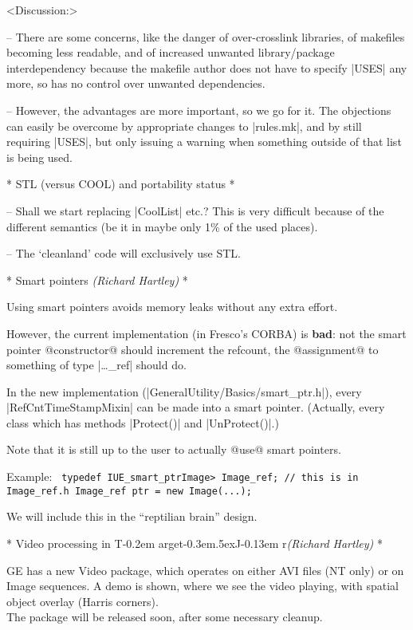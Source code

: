 \documentclass[11pt]{article}
\def\TargetJr{{T\kern-0.2em arget\kern-0.3em\lower.5ex\hbox{\Large J}\kern-0.13em r}}
\def\by#1.{{\normalsize\sf\it(#1)}}\relax
\begin{document}
<Discussion:>

-- There are some concerns, like the danger of over-crosslink libraries,
of makefiles becoming less readable, and of increased unwanted
library/package interdependency because the makefile author does not have to
specify |USES| any more, so has no control over unwanted dependencies.

-- However, the advantages are more important, so we go for it.
The objections can easily be overcome by appropriate changes to |rules.mk|,
and by still requiring |USES|, but only issuing a warning when something
outside of that list is being used.


* STL (versus COOL) and portability status *

-- Shall we start replacing |CoolList| etc.?  This is very difficult because of
the different semantics (be it in maybe only 1\% of the used places).

-- The `cleanland' code will exclusively use STL.


* Smart pointers \by Richard Hartley. *

Using smart pointers avoids memory leaks without any extra effort.

However, the current implementation (in Fresco's CORBA) is {\bf bad}:
not the smart pointer @constructor@ should increment the refcount,
the @assignment@ to something of type |\ldots_ref| should do.

In the new implementation (|GeneralUtility/Basics/smart_ptr.h|),
every |RefCntTimeStampMixin| can be made into a smart pointer.
(Actually, every class which has methods |Protect()| and |UnProtect()|.)

Note that it is still up to the user to actually @use@ smart pointers.

Example:
  {\obeylines\tt
typedef IUE_smart_ptr\<Image> Image_ref; // this is in Image_ref.h
Image_ref ptr = new Image(...);
  }


We will include this in the ``reptilian brain'' design.


* Video processing in \TargetJr \by Richard Hartley. *

GE has a new Video package, which operates on either AVI files (NT only) or
on Image sequences.  A demo is shown, where we see the video playing, with
spatial object overlay (Harris corners). \\
The package will be released soon, after some necessary cleanup.
\end{document}
